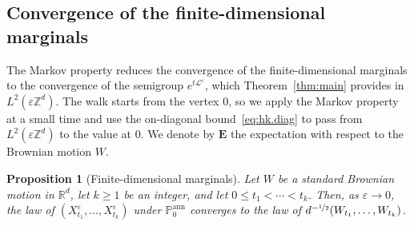 \documentclass[11pt]{amsart}
\newtheorem{proposition}[theorem]{Proposition}
\numberwithin{equation}{section}
\newcommand{\Z}{\mathbb{Z}}
\newcommand{\R}{\mathbb{R}}
\newcommand{\PP}{\mathbb{P}}
\newcommand{\eps}{\varepsilon}
\newcommand{\Leps}{\mathcal{L}^\varepsilon}
\newcommand{\nf}{\nicefrac}
\begin{document}
\subsection{Convergence of the finite-dimensional marginals} \label{sec:fdd}

The Markov property reduces the convergence of the finite-dimensional marginals to the convergence of the semigroup $e^{t \Leps}$, which Theorem~\ref{thm:main} provides in $L^2(\eps \Z^d)$.
The walk starts from the vertex $0$, so we apply the Markov property at a small time and use the on-diagonal bound~\eqref{eq:hk.diag} to pass from $L^2(\eps \Z^d)$ to the value at $0$.
We denote by $\mathbf{E}$ the expectation with respect to the Brownian motion $W$.

\begin{proposition}[Finite-dimensional marginals] \label{prop:fdd}
Let $W$ be a standard Brownian motion in $\R^d$, let $k \geq 1$ be an integer, and let $0 \leq t_1 < \cdots < t_k$.
Then, as $\eps \to 0$, the law of $(X^{\eps}_{t_1}, \ldots, X^{\eps}_{t_k})$ under $\PP^{\mathrm{ann}}_0$ converges to the law of $d^{-\nf12} (W_{t_1}, \ldots, W_{t_k})$.
\end{proposition}
\end{document}
